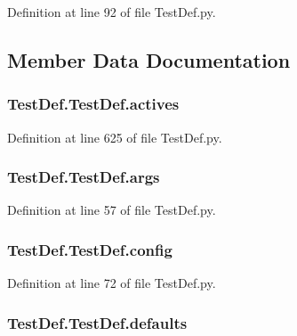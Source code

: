 Definition at line 92 of file Test\-Def.\-py.



\subsection{Member Data Documentation}
\hypertarget{class_test_def_1_1_test_def_a1eb766274fa9869e6b04e612e6d169b0}{
\subsubsection[{actives}]{\setlength{\rightskip}{0pt plus 5cm}Test\-Def.\-Test\-Def.\-actives}}\label{class_test_def_1_1_test_def_a1eb766274fa9869e6b04e612e6d169b0}


Definition at line 625 of file Test\-Def.\-py.

\hypertarget{class_test_def_1_1_test_def_a30e459036991de30822f267f1d882d44}{
\subsubsection[{args}]{\setlength{\rightskip}{0pt plus 5cm}Test\-Def.\-Test\-Def.\-args}}\label{class_test_def_1_1_test_def_a30e459036991de30822f267f1d882d44}


Definition at line 57 of file Test\-Def.\-py.

\hypertarget{class_test_def_1_1_test_def_a85a2e1fffeda060f750494dd4082594d}{
\subsubsection[{config}]{\setlength{\rightskip}{0pt plus 5cm}Test\-Def.\-Test\-Def.\-config}}\label{class_test_def_1_1_test_def_a85a2e1fffeda060f750494dd4082594d}


Definition at line 72 of file Test\-Def.\-py.

\hypertarget{class_test_def_1_1_test_def_a96d72418702f22844fc2fd5d774c7291}{
\subsubsection[{defaults}]{\setlength{\rightskip}{0pt plus 5cm}Test\-Def.\-Test\-Def.\-defaults}}\label{class_test_def_1_1_test_def_a96d72418702f22844fc2fd5d774c7291}



